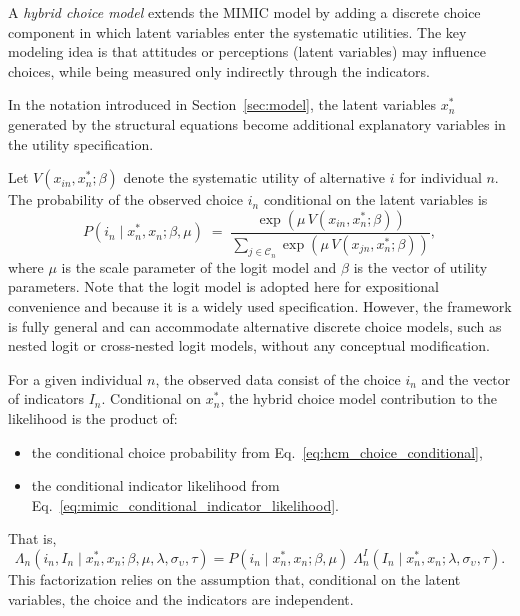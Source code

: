 \documentclass[12pt,a4paper]{article}
\begin{document}
A \emph{hybrid choice model} extends the MIMIC model by adding a
discrete choice component in which latent variables enter the
systematic utilities.  The key modeling idea is that attitudes or
perceptions (latent variables) may influence choices, while being
measured only indirectly through the indicators.

In the notation introduced in Section~\ref{sec:model}, the latent
variables \(x_n^*\) generated by the structural equations become
additional explanatory variables in the utility specification.

Let $V(x_{in},x_n^*;\beta)$ denote the systematic utility of
alternative $i$ for individual $n$. The probability of the observed
choice $i_n$ conditional on the latent variables is
\begin{equation}
  \label{eq:hcm_choice_conditional}
  P(i_n \mid x_n^*,x_n;\beta, \mu) \;=\;
  \frac{\exp\!\left(\mu\,V(x_{in},x_n^*;\beta)\right)}
       {\sum_{j\in\mathcal
           C_n}\exp\!\left(\mu\,V(x_{jn},x_n^*;\beta)\right)},
\end{equation}
where $\mu$ is the scale parameter of the logit model and $\beta$ is
the vector of utility parameters. Note that the logit model is adopted
here for expositional convenience and because it is a widely used
specification. However, the framework is fully general and can
accommodate alternative discrete choice models, such as nested logit
or cross-nested logit models, without any conceptual modification.

For a given individual \(n\), the observed data consist of the choice
\(i_n\) and the vector of indicators \(I_n\). Conditional on $x_n^*$, the hybrid choice model
contribution to the likelihood is the product of:
\begin{itemize}
  \item the conditional choice probability from
    Eq.~\eqref{eq:hcm_choice_conditional},
  \item the conditional indicator likelihood from
    Eq.~\eqref{eq:mimic_conditional_indicator_likelihood}.
\end{itemize}
That is,
\begin{equation}
  \label{eq:hcm_joint_conditional_likelihood}
  \Lambda_n\!\left(i_n,I_n \mid x_n^*,x_n;\beta,\mu,\lambda,\sigma_{\upsilon},\tau\right)
=
P(i_n\mid x_n^*,x_n;\beta, \mu)\;
\Lambda_n^{I}\!\left(I_n \mid x_n^*,x_n;\lambda,\sigma_{\upsilon},\tau\right).
\end{equation}
This factorization relies on the assumption that, conditional on the
latent variables, the choice and the indicators are independent.
\end{document}
